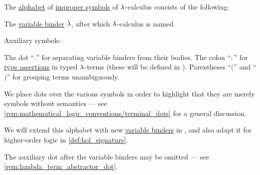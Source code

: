 \begin{definition}\label{def:lambda_term_alphabet}\mimprovised
  The \hyperref[def:formal_language/alphabet]{alphabet} of \hyperref[con:improper_symbol]{improper symbols} of \( {\mathrm \lambda} \)-calculus consists of the following:

  \begin{thmenum}
     The \hyperref[con:variable_binding]{variable binder} \( \mathord{\dot{{\mathrm \lambda}}} \), after which \( {\mathrm \lambda} \)-calculus is named.

     Auxiliary symbols:
    \begin{thmenum}
       The dot \enquote{\( . \)} for separating variable binders from their bodies.
       The colon \enquote{\( : \)} for \hyperref[def:type_assertion]{type assertions} in typed \( {\mathrm \lambda} \)-terms (these will be defined in ).
       Parentheses \enquote{\( ( \)} and \enquote{\( ) \)} for grouping terms unambiguously.
    \end{thmenum}
  \end{thmenum}
\end{definition}
\begin{comments}
  \item We place dots over the various symbols in order to highlight that they are merely symbols without semantics --- see \cref{rem:mathematical_logic_conventions/terminal_dots} for a general discussion.

  \item We will extend this alphabet with new \hyperref[con:variable_binding]{variable binders} in , and also adapt it for higher-order logic in \cref{def:hol_signature}.

  \item The auxiliary dot after the variable binders may be omitted --- see \cref{rem:lambda_term_abstractor_dot}.
\end{comments}

